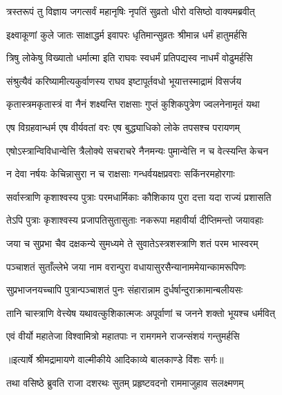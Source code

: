 \twolineshloka
{त्रस्तरूपं तु विज्ञाय जगत्सर्वं महानृषिः}
{नृपतिं सुव्रतो धीरो वसिष्ठो वाक्यमब्रवीत्} %

\twolineshloka
{इक्ष्वाकूणां कुले जातः साक्षाद्धर्म इवापरः}
{धृतिमान्सुव्रतः श्रीमान्न धर्मं हातुमर्हसि} %

\twolineshloka
{त्रिषु लोकेषु विख्यातो धर्मात्मा इति राघवः}
{स्वधर्मं प्रतिपद्यस्व नाधर्मं वोढुमर्हसि} %

\twolineshloka
{संश्रुत्यैवं करिष्यामीत्यकुर्वाणस्य राघव}
{इष्टापूर्तवधो भूयात्तस्माद्रामं विसर्जय} %

\twolineshloka
{कृतास्त्रमकृतास्त्रं वा नैनं शक्ष्यन्ति राक्षसाः}
{गुप्तं कुशिकपुत्रेण ज्वलनेनामृतं यथा} %

\twolineshloka
{एष विग्रहवान्धर्म एष वीर्यवतां वरः}
{एष बुद्ध्याधिको लोके तपसश्च परायणम्} %

\twolineshloka
{एषोऽस्त्रान्विविधान्वेत्ति त्रैलोक्ये सचराचरे}
{नैनमन्यः पुमान्वेत्ति न च वेत्स्यन्ति केचन} %

\twolineshloka
{न देवा नर्षयः केचिन्नासुरा न च राक्षसाः}
{गन्धर्वयक्षप्रवराः सकिंनरमहोरगाः} %

\twolineshloka
{सर्वास्त्राणि कृशाश्वस्य पुत्राः परमधार्मिकाः}
{कौशिकाय पुरा दत्ता यदा राज्यं प्रशासति} %

\twolineshloka
{तेऽपि पुत्राः कृशाश्वस्य प्रजापतिसुतासुताः}
{नकरूपा महावीर्या दीप्तिमन्तो जयावहाः} %

\twolineshloka
{जया च सुप्रभा चैव दक्षकन्ये सुमध्यमे}
{ते सुवातेऽस्त्रशस्त्राणि शतं परम भास्वरम्} %

\twolineshloka
{पञ्चाशतं सुताँल्लेभे जया नाम वरान्पुरा}
{वधायासुरसैन्यानाममेयान्कामरूपिणः} %

\twolineshloka
{सुप्रभाजनयच्चापि पुत्रान्पञ्चाशतं पुनः}
{संहारान्नाम दुर्धर्षान्दुराक्रामान्बलीयसः} %

\twolineshloka
{तानि चास्त्राणि वेत्त्येष यथावत्कुशिकात्मजः}
{अपूर्वाणां च जनने शक्तो भूयश्च धर्मवित्} %

\twolineshloka
{एवं वीर्यो महातेजा विश्वामित्रो महातपाः}
{न रामगमने राजन्संशयं गन्तुमर्हसि} %


{॥इत्यार्षे श्रीमद्रामायणे वाल्मीकीये आदिकाव्ये बालकाण्डे विंशः सर्गः॥}


\twolineshloka
{तथा वसिष्ठे ब्रुवति राजा दशरथः सुतम्}
{प्रहृष्टवदनो राममाजुहाव सलक्ष्मणम्} %

